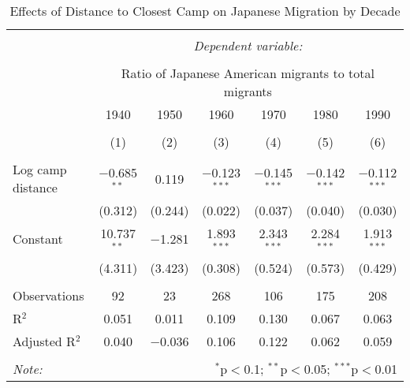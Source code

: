 
\begin{table}[!htbp] \centering 
  \caption{Effects of Distance to Closest Camp on Japanese Migration by Decade} 
  \label{} 
\begin{tabular}{@{\extracolsep{5pt}}lcccccc} 
\\[-1.8ex]\hline 
\hline \\[-1.8ex] 
 & \multicolumn{6}{c}{\textit{Dependent variable:}} \\ 
\cline{2-7} 
\\[-1.8ex] & \multicolumn{6}{c}{Ratio of Japanese American migrants to total migrants} \\ 
 & 1940 & 1950 & 1960 & 1970 & 1980 & 1990 \\ 
\\[-1.8ex] & (1) & (2) & (3) & (4) & (5) & (6)\\ 
\hline \\[-1.8ex] 
 Log camp distance & $-$0.685$^{**}$ & 0.119 & $-$0.123$^{***}$ & $-$0.145$^{***}$ & $-$0.142$^{***}$ & $-$0.112$^{***}$ \\ 
  & (0.312) & (0.244) & (0.022) & (0.037) & (0.040) & (0.030) \\ 
  Constant & 10.737$^{**}$ & $-$1.281 & 1.893$^{***}$ & 2.343$^{***}$ & 2.284$^{***}$ & 1.913$^{***}$ \\ 
  & (4.311) & (3.423) & (0.308) & (0.524) & (0.573) & (0.429) \\ 
 \hline \\[-1.8ex] 
Observations & 92 & 23 & 268 & 106 & 175 & 208 \\ 
R$^{2}$ & 0.051 & 0.011 & 0.109 & 0.130 & 0.067 & 0.063 \\ 
Adjusted R$^{2}$ & 0.040 & $-$0.036 & 0.106 & 0.122 & 0.062 & 0.059 \\ 
\hline 
\hline \\[-1.8ex] 
\textit{Note:}  & \multicolumn{6}{r}{$^{*}$p$<$0.1; $^{**}$p$<$0.05; $^{***}$p$<$0.01} \\ 
\end{tabular} 
\end{table} 

